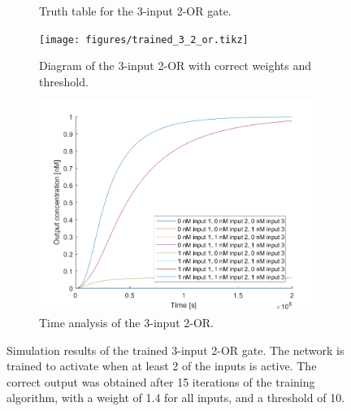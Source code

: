 \begin{figure}[H]
\begin{subfigure}[t]{.49\columnwidth}
\begin{adjustbox}{width=\textwidth}
\begin{tabular}[b]{cccc}
    \hline
    \end{tabular}
  \end{adjustbox}
    \caption{Truth table for the 3-input 2-OR gate.}
\end{subfigure}
\begin{subfigure}[t]{.49\textwidth}
  \texttt{[image: figures/trained\_3\_2\_or.tikz]}
  \caption{Diagram of the 3-input 2-OR with correct weights and threshold.}
\end{subfigure}
\hfill
\begin{subfigure}[t]{\textwidth}
  \centering
\includegraphics[width=\textwidth]{images/or_2_simulation_3input.png}
\caption{Time analysis of the 3-input 2-OR.}
\end{subfigure}
\caption{Simulation results of the trained 3-input 2-OR gate. The network is trained to activate when at least 2 of the inputs is active. The correct output was obtained after 15 iterations of the training algorithm, with a weight of 1.4 for all inputs, and a threshold of 10.}
\label{3_2_or}
\end{figure}
